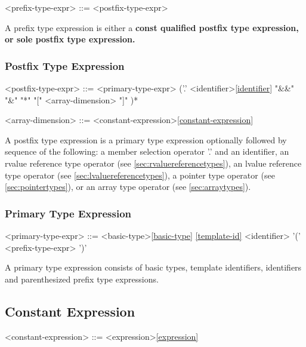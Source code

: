 \documentclass[a4paper,oneside,11pt]{article}
\begin{document}
\begin{grammar}
<prefix-type-expr> ::=  <postfix-type-expr>
\end{grammar}

A prefix type expression is either a \bf{const} qualified postfix type expression,
or sole postfix type expression.

\subsubsection{Postfix Type Expression}\label{sec:postfixtypeexpr}

\begin{grammar}
<postfix-type-expr> ::= <primary-type-expr> ('.' <identifier>\ref{identifier}
\alt "&&"
\alt "&"
\alt "*"
\alt "[" <array-dimension> "]"
)*

<array-dimension> ::= <constant-expression>\ref{constant-expression}
\end{grammar}

A postfix type expression is a primary type expression optionally followed by sequence of the
following:
a member selection operator '.' and an identifier, an rvalue reference type operator (see \ref{sec:rvaluereferencetypes}),
an lvalue reference type operator (see \ref{sec:lvaluereferencetypes}), a pointer type operator (see \ref{sec:pointertypes}),
or an array type operator (see \ref{sec:arraytypes}).

\subsubsection{Primary Type Expression}

\begin{grammar}
<primary-type-expr> ::= <basic-type>\ref{basic-type}
\ref{template-id}
\alt <identifier>
\alt '(' <prefix-type-expr> ')'
\end{grammar}

A primary type expression consists of basic types, template identifiers, identifiers and parenthesized
prefix type expressions.

\subsection{Constant Expression}

\begin{grammar}
\label{constant-expression}<constant-expression> ::= <expression>\ref{expression}
\end{grammar}
\end{document}
